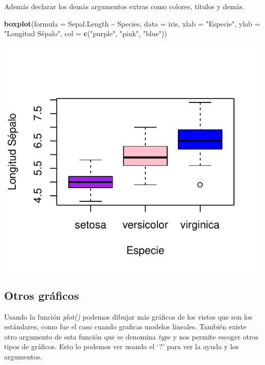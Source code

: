 \documentclass[
]{book}
\newenvironment{Shaded}{\begin{snugshade}}{\end{snugshade}}
\newcommand{\AttributeTok}[1]{\textcolor[rgb]{0.13,0.29,0.53}{#1}}
\newcommand{\FunctionTok}[1]{\textcolor[rgb]{0.13,0.29,0.53}{\textbf{#1}}}
\newcommand{\NormalTok}[1]{#1}
\newcommand{\SpecialCharTok}[1]{\textcolor[rgb]{0.81,0.36,0.00}{\textbf{#1}}}
\newcommand{\StringTok}[1]{\textcolor[rgb]{0.31,0.60,0.02}{#1}}
\begin{document}
Además declarar los demás argumentos extras como colores, títulos y demás.\\

\begin{Shaded}
\begin{Highlighting}[]
\FunctionTok{boxplot}\NormalTok{(}\AttributeTok{formula =}\NormalTok{ Sepal.Length }\SpecialCharTok{\textasciitilde{}}\NormalTok{ Species, }\AttributeTok{data =}\NormalTok{  iris, }\AttributeTok{xlab =} \StringTok{"Especie"}\NormalTok{, }
        \AttributeTok{ylab =} \StringTok{"Longitud Sépalo"}\NormalTok{, }\AttributeTok{col =} \FunctionTok{c}\NormalTok{(}\StringTok{"purple"}\NormalTok{, }\StringTok{"pink"}\NormalTok{, }\StringTok{"blue"}\NormalTok{))}
\end{Highlighting}
\end{Shaded}

\begin{center}\includegraphics{R_Manual_files/figure-latex/unnamed-chunk-195-1} \end{center}

\subsection{Otros gráficos}\label{otros-gruxe1ficos}

Usando la función \emph{plot()} podemos dibujar más gráficos de los vistos que son los estándares, como fue el caso cuando graficas modelos lineales.
También existe otro argumento de esta función que se denomina \emph{type} y nos permite escoger otros tipos de gráficos.
Esto lo podemos ver usando el `?'
para ver la ayuda y los argumentos.\\
\end{document}
